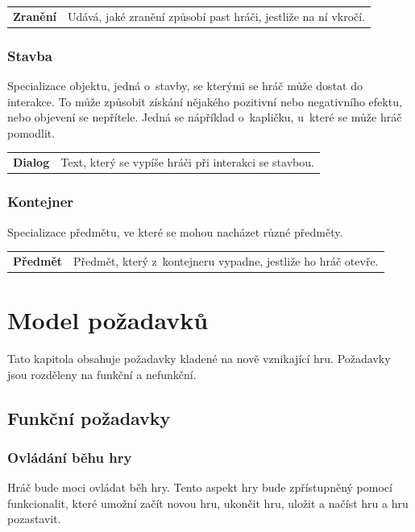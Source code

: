 \documentclass[12pt,a4paper]{article}
\begin{document}
\begin{tabular*}{0.87\textwidth}{ll}
  \bf Zranění & Udává, jaké zranění způsobí past hráči, jestliže na ní
  vkročí.\\[7pt]
\end{tabular*}

\subsubsection{Stavba}
Specializace objektu, jedná o~stavby, se kterými se hráč může dostat do
interakce. To může způsobit získání nějakého pozitivní nebo negativního efektu,
nebo objevení se nepřítele. Jedná se nápříklad o~kapličku, u~které se může hráč
pomodlit.\\[5pt]

\begin{tabular*}{0.87\textwidth}{ll}
  \bf Dialog & Text, který se vypíše hráči při interakci se stavbou.\\[7pt]
\end{tabular*}

\subsubsection{Kontejner}
Specializace předmětu, ve které se mohou nacházet různé předměty.\\[5pt]

\begin{tabular*}{0.87\textwidth}{ll}
  \bf Předmět & Předmět, který z~kontejneru vypadne, jestliže ho hráč
  otevře.\\[7pt]
\end{tabular*}

\section{Model požadavků}
Tato kapitola obsahuje požadavky kladené na nově vznikající hru. Požadavky jsou
rozděleny na funkční a nefunkční.

\subsection{Funkční požadavky}

\subsubsection{Ovládání běhu hry}
Hráč bude moci ovládat běh hry. Tento aspekt hry bude zpřístupněný pomocí
funkcionalit, které umožní začít novou hru, ukončit hru, uložit a načíst hru a
hru pozastavit.
\end{document}
